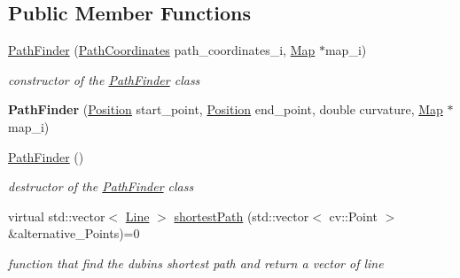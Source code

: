 \subsection*{Public Member Functions}
\begin{DoxyCompactItemize}
\item 
\mbox{\hyperlink{class_path2_d_1_1_path_finder_a0aa8bbd238985f5baa456287671551ea}{Path\+Finder}} (\mbox{\hyperlink{class_path2_d_1_1_element_1_1_path_coordinates}{Path\+Coordinates}} path\+\_\+coordinates\+\_\+i, \mbox{\hyperlink{class_map}{Map}} $\ast$map\+\_\+i)
\begin{DoxyCompactList}\small\item\em constructor of the \mbox{\hyperlink{class_path2_d_1_1_path_finder}{Path\+Finder}} class \end{DoxyCompactList}\item 
\mbox{\label{class_path2_d_1_1_path_finder_a32bdcb63296c44e8777d0f247f2072ea}} 
{\bfseries Path\+Finder} (\mbox{\hyperlink{class_path2_d_1_1_element_1_1_position}{Position}} start\+\_\+point, \mbox{\hyperlink{class_path2_d_1_1_element_1_1_position}{Position}} end\+\_\+point, double curvature, \mbox{\hyperlink{class_map}{Map}} $\ast$map\+\_\+i)
\item 
\mbox{\label{class_path2_d_1_1_path_finder_a96141cb3260846bab64d45f3a8f40515}} 
\mbox{\hyperlink{class_path2_d_1_1_path_finder_a96141cb3260846bab64d45f3a8f40515}{Path\+Finder}} ()
\begin{DoxyCompactList}\small\item\em destructor of the \mbox{\hyperlink{class_path2_d_1_1_path_finder}{Path\+Finder}} class \end{DoxyCompactList}\item 
virtual std\+::vector$<$ \mbox{\hyperlink{class_path2_d_1_1_element_1_1_line}{Line}} $>$ \mbox{\hyperlink{class_path2_d_1_1_path_finder_a5d050326067c313925d87ac37612a181}{shortest\+Path}} (std\+::vector$<$ cv\+::\+Point $>$ \&alternative\+\_\+\+Points)=0
\begin{DoxyCompactList}\small\item\em function that find the dubins shortest path and return a vector of line \end{DoxyCompactList}\end{DoxyCompactItemize}
